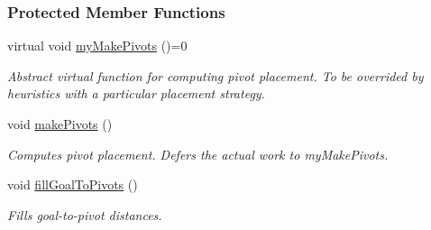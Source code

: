 \subsubsection*{Protected Member Functions}
\begin{DoxyCompactItemize}
\item 
virtual void \hyperlink{structslb_1_1ext_1_1heuristic_1_1differential_1_1HBase_a1a0ff1f5ff5a750f2428f5241375640f}{my\+Make\+Pivots} ()=0\hypertarget{structslb_1_1ext_1_1heuristic_1_1differential_1_1HBase_a1a0ff1f5ff5a750f2428f5241375640f}{}\label{structslb_1_1ext_1_1heuristic_1_1differential_1_1HBase_a1a0ff1f5ff5a750f2428f5241375640f}

\begin{DoxyCompactList}\small\item\em Abstract virtual function for computing pivot placement. To be overrided by heuristics with a particular placement strategy. \end{DoxyCompactList}\item 
void \hyperlink{structslb_1_1ext_1_1heuristic_1_1differential_1_1HBase_aa56f8b55c82c5b2dc2e2f5c7a4a4d203}{make\+Pivots} ()\hypertarget{structslb_1_1ext_1_1heuristic_1_1differential_1_1HBase_aa56f8b55c82c5b2dc2e2f5c7a4a4d203}{}\label{structslb_1_1ext_1_1heuristic_1_1differential_1_1HBase_aa56f8b55c82c5b2dc2e2f5c7a4a4d203}

\begin{DoxyCompactList}\small\item\em Computes pivot placement. Defers the actual work to my\+Make\+Pivots. \end{DoxyCompactList}\item 
void \hyperlink{structslb_1_1ext_1_1heuristic_1_1differential_1_1HBase_aa2ad978bc22d55014671017da92e57f7}{fill\+Goal\+To\+Pivots} ()\hypertarget{structslb_1_1ext_1_1heuristic_1_1differential_1_1HBase_aa2ad978bc22d55014671017da92e57f7}{}\label{structslb_1_1ext_1_1heuristic_1_1differential_1_1HBase_aa2ad978bc22d55014671017da92e57f7}

\begin{DoxyCompactList}\small\item\em Fills goal-\/to-\/pivot distances. \end{DoxyCompactList}\end{DoxyCompactItemize}
